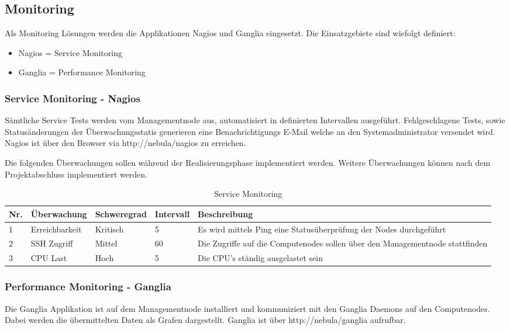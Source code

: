 \subsection{Monitoring}
Als Monitoring Lösungen werden die Applikationen Nagios und Ganglia eingesetzt. Die Einsatzgebiete sind wiefolgt definiert:
\begin{itemize} 
\item {Nagios = Service Monitoring}
\item {Ganglia = Performance Monitoring}
\end{itemize}

\subsubsection{Service Monitoring - Nagios}
Sämtliche Service Tests werden vom Managementnode aus, automatisiert in definierten Intervallen ausgeführt.  Fehlgeschlagene Tests, sowie Statusänderungen der Überwachungsstatis generieren eine Benachrichtigungs E-Mail welche an den Systemadministrator versendet wird. Nagios ist über den Browser via http://nebula/nagios zu erreichen.\newline

Die folgenden Überwachungen sollen während der Realisierungsphase implementiert werden. Weitere Überwachungen können nach dem Projektabschluss implementiert werden.


\begin{table}[H]
\begin{tabular}[t]{p{0.6cm}p{2.5cm}p{2.2cm}p{1.5cm}p{8.8cm}}
\hline
\rowcolor{heading}\textbf{Nr.} & \textbf{Überwachung} & \textbf{Schweregrad} & \textbf{Intervall} &\textbf{Beschreibung} \\\hline
1 & Erreichbarkeit & Kritisch & 5 & Es wird mittels Ping eine Statusüberprüfung der Nodes durchgeführt \\\hline
2 & SSH Zugriff & Mittel & 60 & Die Zugriffe auf die Computenodes sollen über den Managementnode stattfinden  \\\hline
3 & CPU Last & Hoch & 5 & Die CPU's ständig ausgelastet sein  \\\hline
\end{tabular}
\caption{Service Monitoring}
\end{table}

\subsubsection{Performance Monitoring - Ganglia}
Die Ganglia Applikation ist auf dem Managementnode installiert und kommuniziert mit den Ganglia Daemons auf den Computenodes. Dabei werden die übermittelten Daten als Grafen dargestellt. Ganglia ist über http://nebula/ganglia aufrufbar.


